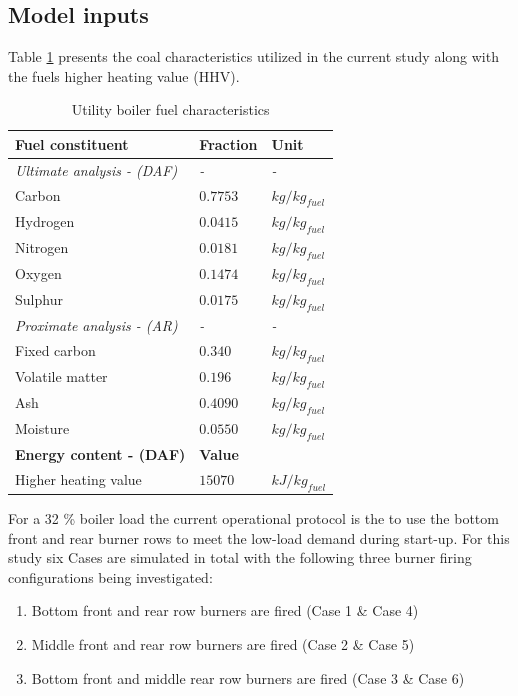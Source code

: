 \documentclass[review]{elsarticle}
\begin{document}
\subsection{Model inputs}
Table \ref{tbl_fuel} presents the coal characteristics utilized in the current study along with the fuels higher heating value (HHV).\\
\begin{table}[h!]
\centering
\caption{Utility boiler fuel characteristics}
\vspace{2mm}
\label{tbl_fuel}
{\tabulinesep=1.2mm
\begin{tabularx}{\textwidth}{p{} p{} l}
\hline
\textbf{Fuel constituent} & \textbf{Fraction} & \textbf{Unit}\\
\hline
\textit{Ultimate analysis - (DAF)} & \textit{-} & \textit{-}\\
Carbon & $0.7753$ & $kg/kg_{fuel}$\\
Hydrogen & $0.0415$ & $kg/kg_{fuel}$\\
Nitrogen & $0.0181$ & $kg/kg_{fuel}$\\
Oxygen & $0.1474$ & $kg/kg_{fuel}$\\
Sulphur & $0.0175$ & $kg/kg_{fuel}$\\
\textit{Proximate analysis - (AR)} & \textit{-} & \textit{-}\\
Fixed carbon & $0.340$ & $kg/kg_{fuel}$\\
Volatile matter & $0.196$ & $kg/kg_{fuel}$\\
Ash & $0.4090$ & $kg/kg_{fuel}$\\
Moisture & $0.0550$ & $kg/kg_{fuel}$\\
\hline
\textbf{Energy content - (DAF)} & \textbf{Value} &\\
\hline
Higher heating value & $15070$ & $kJ/kg_{fuel}$\\
\hline
\end{tabularx}}
\end{table}

For a 32 \% boiler load the current operational protocol is the to use the bottom front and rear burner rows to meet the low-load demand during start-up.  For this study six Cases are simulated in total with the following three burner firing configurations being investigated:
\begin{enumerate}
\item Bottom front and rear row burners are fired (Case 1 \& Case 4)
\item Middle front and rear row burners are fired (Case 2 \& Case 5)
\item Bottom front and middle rear row burners are fired (Case 3 \& Case 6)
\end{enumerate}
\end{document}
